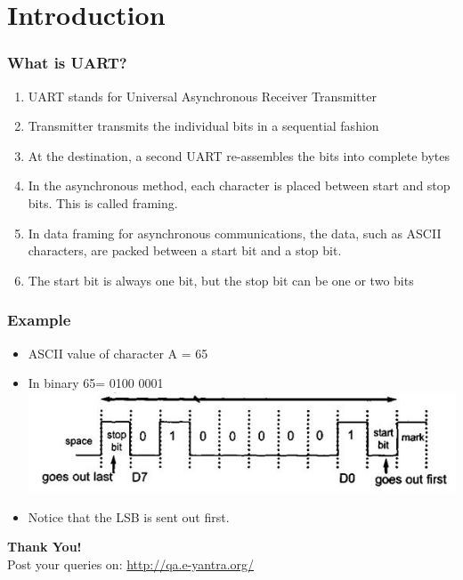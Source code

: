 \documentclass[10pt,red]{beamer}
\title
[
	Raspberry Pi Hardware Development	%
	\hspace{0.5cm}
	\insertframenumber/\inserttotalframenumber
]
{
	UART communication between Rpi and Android device
}
\author
[
	www.e-yantra.org
]
{
	e-Yantra Team \\
  Embedded Real-Time Systems Lab\\
  Indian Institute of Technology-Bombay \\
}
\date
{
IIT Bombay \\ {\today}
}
\begin{document}
 

\begin{frame}
	\titlepage
\end{frame}
\section{Introduction}
\begin{frame}
	\frametitle{What is UART?}
		\begin{enumerate}[$\checkmark$]
			\item<+-|alert@+> UART stands for Universal Asynchronous Receiver Transmitter
			\item<+-|alert@+> Transmitter transmits the individual bits in a sequential fashion
			\item<+-|alert@+> At the destination, a second UART re-assembles the bits into complete bytes
			\item<+-|alert@+> In the asynchronous method, each character is placed between start and stop bits. This is called framing. \item<+-|alert@+> In data framing for asynchronous communications, the data, such as ASCII characters, are packed
			between a start bit and a stop bit. 
			\item<+-|alert@+> The start bit is always one bit, but the stop bit can be one or two bits
		\end{enumerate}
\end{frame}
\begin{frame}
	\frametitle{Example}
	\begin{itemize}
			\item<+-|alert@+> ASCII value of character A = 65
			\item<+-|alert@+> In binary 65= 0100 0001 \\ \pause 
			\vspace{8mm}
			\includegraphics[scale=0.4]{example}
			\item<+-|alert@+> Notice that the LSB is sent out first.
	\end{itemize}
\end{frame}

 \begin{frame}
 	\hskip4cm
 	\textbf{\LARGE Thank You!} \\[20pt]
 	\hskip3cm
 	\scriptsize Post your queries on: 
 	\hyperref[www.e-yantra.org]{\color{blue} http://qa.e-yantra.org/ \color{black}} 
 \end{frame}
\end{document}
